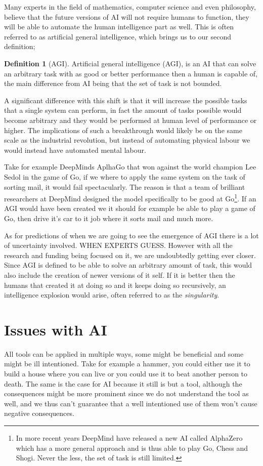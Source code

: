 \documentclass{report}
\theoremstyle{definition}
\newtheorem{definition}{Definition}[section]
\begin{document}
Many experts in the field of mathematics, computer science and even philosophy, believe that the future versions of AI will not require humans to function, they will be able to automate the human intelligence part as well. This is often referred to as artificial general intelligence, which brings us to our second definition;
\begin{definition}[AGI]
Artificial general intelligence (AGI), is an AI that can solve an arbitrary task with as good or better performance then a human is capable of, the main difference from AI being that the set of task is not bounded.
  \label{AGI}
\end{definition}
A significant difference with this shift is that it will increase the possible tasks that a single system can perform, in fact the amount of tasks possible would become arbitrary and they would be performed at human level of performance or higher. The implications of such a breakthrough would likely be on the same scale as the industrial revolution, but instead of automating physical labour we would instead have automated mental labour. 

Take for example DeepMinds AplhaGo that won against the world champion Lee Sedol in the game of Go, if we where to apply the same system on the task of sorting mail, it would fail spectacularly. The reason is that a team of brilliant researchers at DeepMind designed the model specifically to be good at Go\footnote{In more recent years DeepMind have released a new AI called AlphaZero which has a more general approach and is thus able to play Go, Chess and Shogi. Never the less, the set of task is still limited.}. If an AGI would have been created we it should for example be able to play a game of Go, then drive it's car to it job where it sorts mail and much more. 

As for predictions of when we are going to see the emergence of AGI there is a lot of uncertainty involved. WHEN EXPERTS GUESS. However with all the research and funding being focused on it, we are undoubtedly getting ever closer. Since AGI is defined to be able to solve an arbitrary amount of task, this would also include the creation of newer versions of it self. If it is better then the humans that created it at doing so and it keeps doing so recursively, an intelligence explosion would arise, often referred to as the \textit{singularity}.

\section{Issues with AI}
All tools can be applied in multiple ways, some might be beneficial and some might be ill intentioned. Take for example a hammer, you could either use it to build a house where you can live or you could use it to beat another person to death. The same is the case for AI because it still is but a tool, although the consequences might be more prominent since we do not understand the tool as well, and we thus can't guarantee that a well intentioned use of them won't cause negative consequences. 
\end{document}
